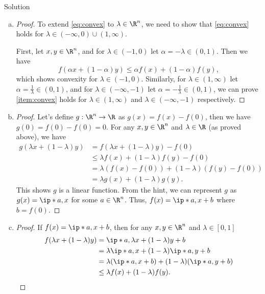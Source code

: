 \documentclass{article}
\theoremstyle{plain}
\theoremstyle{definition}
\theoremstyle{remark}
\begin{document}
\begin{solution}
    {Solution}
    \begin{enumerate}[(a)]
        \item {
            \begin{proof}
                To extend \cref{eq:convex} to $\lambda\in\R^n$, we need to show that \cref{eq:convex} holds for $\lambda\in(-\infty,0)\cup(1,\infty)$.

                First, let $x,y\in\R^n$, and for $\lambda\in(-1,0)$ let $\alpha=-\lambda\in(0,1)$. Then we have
                \[
                    f(\alpha x+(1-\alpha)y) \leq \alpha f(x)+(1-\alpha)f(y),
                \]
                which shows convexity for $\lambda\in(-1,0)$.
                Similarly, for $\lambda\in(1,\infty)$ let $\alpha=\frac{1}{\lambda}\in(0,1)$, and for $\lambda\in(-\infty,-1)$ let $\alpha=-\frac{1}{\lambda}\in(0,1)$, we can prove \cref{item:convex} holds for $\lambda\in(1,\infty)$ and $\lambda\in(-\infty,-1)$ respectively.
            \end{proof}
        }
        \item {
            \begin{proof}
                Let's define $g:\R^n\rightarrow\R$ as $g(x)=f(x)-f(0)$, then we have $g(0)=f(0)-f(0)=0$. For any $x,y\in\R^n$ and $\lambda\in\R$ (as proved above), we have
                \begin{align*}
                    g(\lambda x+(1-\lambda)y) &= f(\lambda x+(1-\lambda)y)-f(0)\\
                    &\leq \lambda f(x)+(1-\lambda)f(y)-f(0)\\
                    &= \lambda(f(x)-f(0))+(1-\lambda)(f(y)-f(0))\\
                    &= \lambda g(x)+(1-\lambda)g(y).
                \end{align*}
                This shows $g$ is a linear function. From the hint, we can represent $g$ as $g(x)=\ip*{a,x}$ for some $a\in\R^n$. Thus, $f(x)=\ip*{a,x}+b$ where $b=f(0)$.
            \end{proof}
        }
        \item {
            \begin{proof}
                If $f(x)=\ip*{a,x}+b$, then for any $x,y\in\R^n$ and $\lambda\in[0,1]$
                \begin{align*}
                    f(\lambda x+(1-\lambda)y) &= \ip*{a,\lambda x+(1-\lambda)y}+b\\
                    &= \lambda\ip*{a,x}+(1-\lambda)\ip*{a,y}+b\\
                    &= \lambda(\ip*{a,x}+b)+(1-\lambda)(\ip*{a,y}+b)\\
                    &\leq \lambda f(x)+(1-\lambda)f(y).
                \end{align*}
            \end{proof}
        }
    \end{enumerate}
\end{solution}
\end{document}
